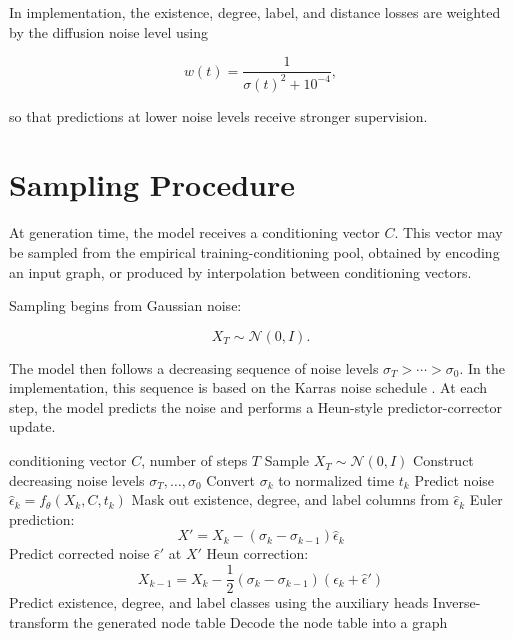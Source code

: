 In implementation, the existence, degree, label, and distance losses are weighted
by the diffusion noise level using

\[
w(t) = \frac{1}{\sigma(t)^2 + 10^{-4}},
\]

so that predictions at lower noise levels receive stronger supervision.

\section{Sampling Procedure}
\label{sec:generator:sampling}

At generation time, the model receives a conditioning vector \(C\). This vector
may be sampled from the empirical training-conditioning pool, obtained by
encoding an input graph, or produced by interpolation between conditioning
vectors.

Sampling begins from Gaussian noise:

\[
X_T \sim \mathcal{N}(0,I).
\]

The model then follows a decreasing sequence of noise levels
\(\sigma_T > \cdots > \sigma_0\). In the implementation, this sequence is based
on the Karras noise schedule \citep{karras2022elucidating}. At each step, the
model predicts the noise and performs a Heun-style predictor-corrector update.

\begin{algorithm}[H]
\caption{Conditional denoising graph generation}
\label{alg:generator:sampling}
\begin{algorithmic}[1]
\Require conditioning vector \(C\), number of steps \(T\)
\State Sample \(X_T \sim \mathcal{N}(0,I)\)
\State Construct decreasing noise levels \(\sigma_T,\ldots,\sigma_0\)
    \State Convert \(\sigma_k\) to normalized time \(t_k\)
    \State Predict noise \(\hat\epsilon_k = f_\theta(X_k,C,t_k)\)
    \State Mask out existence, degree, and label columns from \(\hat\epsilon_k\)
    \State Euler prediction:
    \[
    X' = X_k - (\sigma_k-\sigma_{k-1})\hat\epsilon_k
    \]
    \State Predict corrected noise \(\hat\epsilon'\) at \(X'\)
    \State Heun correction:
    \[
    X_{k-1}
    =
    X_k
    -
    \frac{1}{2}(\sigma_k-\sigma_{k-1})
    (\hat\epsilon_k+\hat\epsilon')
    \]
\EndFor
\State Predict existence, degree, and label classes using the auxiliary heads
\State Inverse-transform the generated node table
\State Decode the node table into a graph
\end{algorithmic}
\end{algorithm}

